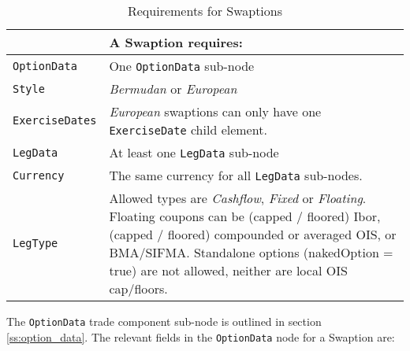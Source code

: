 \begin{table}[H]
\centering
\begin{tabular} {|l|p{10cm}|}
    \hline
        & \bfseries{A  Swaption requires:} \\  \hline
    \lstinline!OptionData! & One \lstinline!OptionData! sub-node  \\  \hline
    \lstinline!Style! &  \emph{Bermudan} or \emph{European}\\ \hline
    \lstinline!ExerciseDates! & \emph{European} swaptions can only have one \lstinline!ExerciseDate! child element. \\ \hline
    \lstinline!LegData! &  At least one \lstinline!LegData! sub-node \\ \hline
    \lstinline!Currency! & The same currency for all \lstinline!LegData! sub-nodes.\\ \hline
    \lstinline!LegType! & Allowed types are \emph{Cashflow}, \emph{Fixed} or \emph{Floating}. Floating coupons can be (capped / floored) Ibor, (capped / floored) compounded or averaged OIS, or BMA/SIFMA. Standalone options (nakedOption = true) are not allowed, neither are local OIS cap/floors. \\ \hline
  \end{tabular}
  \caption{Requirements for Swaptions}
  \label{tab:swaption_requirements}
\end{table}

The \lstinline!OptionData! trade component sub-node is outlined in section \ref{ss:option_data}. 
The relevant fields in the \lstinline!OptionData! node for a Swaption are:

